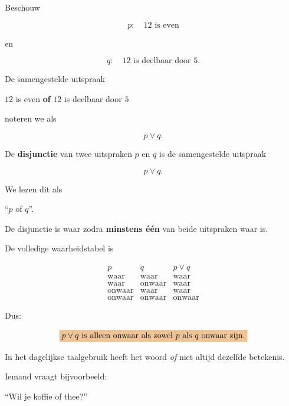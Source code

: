 \documentclass{ximera}
\begin{document}
  Beschouw

  \[
  p:\quad 12\text{ is even}
  \]

  en

  \[
  q:\quad 12\text{ is deelbaar door }5.
  \]

  De samengestelde uitspraak

  \begin{center}
  $12$ is even \textbf{of} $12$ is deelbaar door $5$
  \end{center}

  noteren we als

  \[
  p\lor q.
  \]


  \begin{definitie}
  De \textbf{disjunctie} van twee uitspraken $p$ en $q$ is de
  samengestelde uitspraak

  \[
  p\lor q.
  \]

  We lezen dit als

  \begin{center}
  ``$p$ of $q$''.
  \end{center}

  De disjunctie is waar zodra \textbf{minstens één} van beide uitspraken
  waar is.
  \end{definitie}


  De volledige waarheidstabel is

  \[
  \begin{array}{c|c|c}
  p & q & p\lor q\\
  \hline
  \text{waar} & \text{waar} & \text{waar}\\
  \text{waar} & \text{onwaar} & \text{waar}\\
  \text{onwaar} & \text{waar} & \text{waar}\\
  \text{onwaar} & \text{onwaar} & \text{onwaar}
  \end{array}
  \]


  Dus:

  \[
  \important{
  p\lor q\text{ is alleen onwaar als zowel }p\text{ als }q\text{ onwaar zijn.}
  }
  \]



  In het dagelijkse taalgebruik heeft het woord \emph{of} niet altijd
  dezelfde betekenis.

  Iemand vraagt bijvoorbeeld:

  \begin{center}
  ``Wil je koffie of thee?''
  \end{center}
\end{document}
